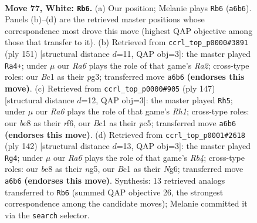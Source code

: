 \documentclass[11pt]{article}
\begin{document}
\clearpage

\begin{figure}[p]\centering
\begin{subfigure}{0.46\textwidth}\centering
\resizebox{\linewidth}{!}{%
\newchessgame
\chessboard[
  setfen={4b1k1/8/R7/8/1P6/8/K1p3r1/2B5 w - - 6 77},
  showmover=false,
  pgfstyle=straightmove, color=movearrow, markmove={a6-b6}
]}
\caption{}
\end{subfigure}\hfill
\begin{subfigure}{0.46\textwidth}\centering
\resizebox{\linewidth}{!}{%
\newchessgame
\chessboard[
  setfen={2R5/r5k1/8/5p2/2K5/6P1/8/8 b - - 0 76},
  showmover=false,
  pgfstyle=straightmove, color=movearrow, markmove={a7-a4}
]}
\caption{}
\end{subfigure}
\\[4pt]
\begin{subfigure}{0.46\textwidth}\centering
\resizebox{\linewidth}{!}{%
\newchessgame
\chessboard[
  setfen={7r/K5R1/5R2/2P5/8/1P6/7k/8 b - - 0 74},
  showmover=false,
  pgfstyle=straightmove, color=movearrow, markmove={h8-h5}
]}
\caption{}
\end{subfigure}\hfill
\begin{subfigure}{0.46\textwidth}\centering
\resizebox{\linewidth}{!}{%
\newchessgame
\chessboard[
  setfen={8/2k3p1/6N1/2r3nP/1R6/8/8/1K6 w - - 1 72},
  showmover=false,
  pgfstyle=straightmove, color=movearrow, markmove={b4-g4}
]}
\caption{}
\end{subfigure}
\caption{\textbf{Move 77, White: \texttt{Rb6}.} (a) Our position; Melanie plays \texttt{Rb6} (\texttt{a6b6}). Panels (b)--(d) are the retrieved master positions whose correspondence most drove this move (highest QAP objective among those that transfer to it). (b) Retrieved from \texttt{ccrl\_top\_p0000\#3891} (ply 151) [structural distance $d$=11, QAP obj=3]: the master played \texttt{Ra4+}; under $\mu$ our \emph{Ra6} plays the role of that game's \emph{Ra2}; cross-type roles: our \emph{B}c1 as their \emph{p}g3; transferred move \texttt{a6b6} \textbf{(endorses this move)}. (c) Retrieved from \texttt{ccrl\_top\_p0000\#905} (ply 147) [structural distance $d$=12, QAP obj=3]: the master played \texttt{Rh5}; under $\mu$ our \emph{Ra6} plays the role of that game's \emph{Rh1}; cross-type roles: our \emph{b}e8 as their \emph{r}f6, our \emph{B}c1 as their \emph{p}c5; transferred move \texttt{a6b6} \textbf{(endorses this move)}. (d) Retrieved from \texttt{ccrl\_top\_p0001\#2618} (ply 142) [structural distance $d$=13, QAP obj=3]: the master played \texttt{Rg4}; under $\mu$ our \emph{Ra6} plays the role of that game's \emph{Rb4}; cross-type roles: our \emph{b}e8 as their \emph{n}g5, our \emph{B}c1 as their \emph{N}g6; transferred move \texttt{a6b6} \textbf{(endorses this move)}. Synthesis: 13 retrieved analogs transferred to \texttt{Rb6} (summed QAP objective 26, the strongest correspondence among the candidate moves); Melanie committed it via the \texttt{search} selector.}
\label{fig:thought-m152}
\end{figure}
\end{document}
